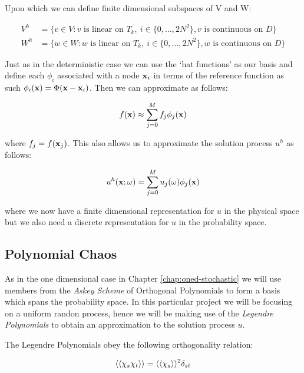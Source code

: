 Upon which we can define finite dimensional subspaces of V and W:

\begin{align*}
    V^h &= \{v \in V: v \text{ is linear on } T_k,\ i \in \{0, \ldots, 2N^2\},
                      v \text{ is continuous on } D\} \\
    W^h &= \{w \in W: w \text{ is linear on } T_k,\ i \in \{0, \ldots, 2N^2\},
                      w \text{ is continuous on } D\}
\end{align*}

Just as in the deterministic case we can use the `hat functions' as our basis
and define each $\phi_i$ associated with a node $\mathbf{x}_i$ in terms of the
reference function  as such
$\phi_i(\mathbf{x}) = \Phi(\mathbf{x} - \mathbf{x}_i)$. Then we can approximate as follows:

\begin{equation}\label{eq:twod-stochastic-f-approx}
    f(\mathbf{x}) \approx \sum_{j=0}^Mf_j\phi_j(\mathbf{x})
\end{equation}

where $f_j = f(\mathbf{x}_j)$. This also allows us to approximate the solution
process $u^h$ as follows:

\begin{equation}
    u^h(\mathbf{x};\omega) = \sum_{j=0}^Mu_j(\omega)\phi_j(\mathbf{x})
\end{equation}

where we now have a finite dimensional representation for $u$ in the physical
space but we also need a discrete representation for $u$ in the probability
space.

\subsection{Polynomial Chaos}

As in the one dimensional case in Chapter \ref{chap:oned-stochastic} we will
use members from the \textit{Askey Scheme} of Orthogonal Polynomials to form a
basis which spans the probability space. In this particular project we will be
focusing on a uniform randon process, hence we will be making use of the
\textit{Legendre Polynomials} to obtain an approximation to the solution process
$u$.

The Legendre Polynomials obey the following orthogonality relation:

\begin{equation}
    \left\langle\langle\chi_s\chi_t\right\rangle\rangle = \left\langle\langle\chi_s\right\rangle\rangle^2\delta_{st}
\end{equation}

